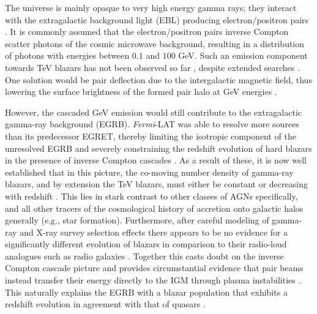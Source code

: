 \documentclass[numberedappendix]{emulateapj}
\begin{document}
The universe is mainly opaque to very high energy gamma rays; they interact with the extragalactic background light (EBL) producing electron/positron pairs \citep{1967PhRv..155.1408G,1992ApJ...390L..49S}. It is commonly assumed that the electron/positron pairs inverse Compton scatter photons of the cosmic microwave background, resulting in a distribution of photons with energies between $0.1$ and $100$ GeV. Such an emission component towards TeV blazars has not been observed so far \citep{2010A&A...524A..77A}, despite extended searches \citep{2014A&A...562A.145H}. One solution would be pair deflection due to the intergalactic magnetic field, thus lowering the surface brightness of the formed pair halo at GeV energies \citep{2013A&ARv..21...62D,2012ApJ...747L..14V,2011ApJ...733L..21D}. 

However, the cascaded GeV emission would still contribute to the extragalactic gamma-ray background (EGRB). \textit{Fermi}-LAT was able to resolve more sources than its predecessor EGRET, thereby limiting the isotropic component of the unresolved EGRB and severely constraining the redshift evolution of hard blazars in the presence of inverse Compton cascades \citep[e.g.,][]{Vent:10,Murase:2012,Inoue:2012}. As a result of these, it is now well established that in this picture, the co-moving number density of gamma-ray blazars, and by extension the TeV blazars, must either be constant or decreasing with redshift \citep{Knei-Mann:08,Vent:10,Abazajian:2011,Inoue:2012}.  This lies in stark contrast to other classes of AGNs specifically, and all other tracers of the cosmological history of accretion onto galactic halos generally (e.g., star formation).  Furthermore, after careful modeling of gamma-ray and X-ray survey selection effects there appears to be no evidence for a significantly different evolution of blazars in comparison to their radio-loud analogues such as radio galaxies \citep{Giommi:2012,Giommi:2013}. Together this casts doubt on the inverse Compton cascade picture and provides circumstantial evidence that pair beams instead transfer their energy directly to the IGM through plasma instabilities \citep{2012ApJ...752...22B, 2012ApJ...758..102S, 2013ApJ...777...49S,2014arXiv1410.3797C}. This naturally explains the EGRB with a blazar population that exhibits a redshift evolution in agreement with that of quasars \citep{2014ApJ...790..137B,2013arXiv1308.0015B}.
\end{document}
